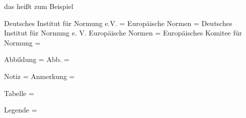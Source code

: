 

 {} %
 {} %

	{das heißt}
	{zum Beispiel}



Deutsches Institut für Normung e.V. =
Europäische Normen =
Deutsches Institut für Normung e. V. Europäische Normen =
Europäisches Komitee für Normung =

Abbildung =
Abb. =

Notiz =
Anmerkung =

Tabelle =

Legende =
